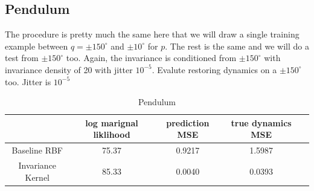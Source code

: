 \documentclass{statsmsc}
\begin{document}
\subsection{Pendulum}
The procedure is pretty much the same here that we will draw a single training example between $q=\pm 150^{\circ}$ and $\pm 10^{\circ}$ for $p$.
The rest is the same and we will do a test from $\pm 150^{\circ}$ too.
Again, the invariance is conditioned from $\pm 150^{\circ}$ with invariance density of 20 with jitter $10^{-5}$.
Evalute restoring dynamics on a $\pm 150^{\circ}$ too.
Jitter is $10^{-5}$
\begin{table}[H]
  \centering
  \begin{tabular}{ c c c c c}
    \hline
                    & log marignal liklihood &  prediction MSE & true dynamics MSE\\
                    \hline
Baseline RBF & 75.37 & 0.9217 & 1.5987 \\
Invariance Kernel & 85.33 & 0.0040 & 0.0393 \\
    \hline
  \end{tabular}
  \caption{Pendulum }
  \label{tab:pendulum_performance}
\end{table}
\end{document}
